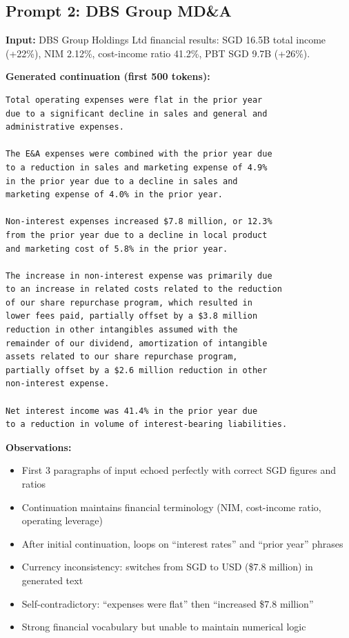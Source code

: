 \documentclass[12pt]{article}
\begin{document}
\subsection{Prompt 2: DBS Group MD\&A}

\textbf{Input:} DBS Group Holdings Ltd financial results: SGD 16.5B total income (+22\%), NIM 2.12\%, cost-income ratio 41.2\%, PBT SGD 9.7B (+26\%).

\textbf{Generated continuation (first 500 tokens):}

\begin{Verbatim}[fontsize=\small]
Total operating expenses were flat in the prior year
due to a significant decline in sales and general and
administrative expenses.

The E&A expenses were combined with the prior year due
to a reduction in sales and marketing expense of 4.9%
in the prior year due to a decline in sales and
marketing expense of 4.0% in the prior year.

Non-interest expenses increased $7.8 million, or 12.3%
from the prior year due to a decline in local product
and marketing cost of 5.8% in the prior year.

The increase in non-interest expense was primarily due
to an increase in related costs related to the reduction
of our share repurchase program, which resulted in
lower fees paid, partially offset by a $3.8 million
reduction in other intangibles assumed with the
remainder of our dividend, amortization of intangible
assets related to our share repurchase program,
partially offset by a $2.6 million reduction in other
non-interest expense.

Net interest income was 41.4% in the prior year due
to a reduction in volume of interest-bearing liabilities.
\end{Verbatim}

\textbf{Observations:}
\begin{itemize}
    \item First 3 paragraphs of input echoed perfectly with correct SGD figures and ratios
    \item Continuation maintains financial terminology (NIM, cost-income ratio, operating leverage)
    \item After initial continuation, loops on ``interest rates'' and ``prior year'' phrases
    \item Currency inconsistency: switches from SGD to USD (\$7.8 million) in generated text
    \item Self-contradictory: ``expenses were flat'' then ``increased \$7.8 million''
    \item Strong financial vocabulary but unable to maintain numerical logic
\end{itemize}
\end{document}
